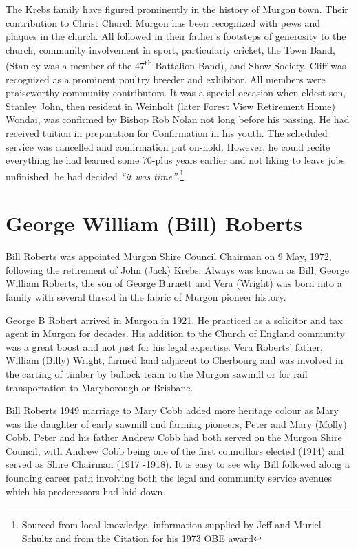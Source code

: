 The Krebs family have figured prominently in the history of Murgon town. Their contribution to Christ Church Murgon has been recognized with pews and plaques in the church. All followed in their father's footsteps of generosity to the church, community involvement in sport, particularly cricket, the Town Band, (Stanley was a member of the 47\textsuperscript{th} Battalion Band), and Show Society. Cliff was recognized as a prominent poultry breeder and exhibitor. All members were praiseworthy community contributors. It was a special occasion when eldest son, Stanley John, then resident in Weinholt (later Forest View Retirement Home) Wondai, was confirmed by Bishop Rob Nolan not long before his passing. He had received tuition in preparation for Confirmation in his youth. The scheduled service was cancelled and confirmation put on-hold. However, he could recite everything he had learned some 70-plus years earlier and not liking to leave jobs unfinished, he had decided \emph{``it was time''}.\footnote{Sourced from local knowledge, information supplied by Jeff and Muriel Schultz and from the Citation for his 1973 OBE award}


\section{George William (Bill) Roberts}



Bill Roberts was appointed Murgon Shire Council Chairman on 9 May, 1972, following the retirement of John (Jack) Krebs. Always was known as Bill, George William Roberts, the son of George Burnett and Vera (Wright) was born into a family with several thread in the fabric of Murgon pioneer history.



George B Robert arrived in Murgon in 1921. He practiced as a solicitor and tax agent in Murgon for decades. His addition to the Church of England community was a great boost and not just for his legal expertise. Vera Roberts' father, William (Billy) Wright, farmed land adjacent to Cherbourg and was involved in the carting of timber by bullock team to the Murgon sawmill or for rail transportation to Maryborough or Brisbane.



Bill Roberts 1949 marriage to Mary Cobb added more heritage colour as Mary was the daughter of early sawmill and farming pioneers, Peter and Mary (Molly) Cobb. Peter and his father Andrew Cobb had both served on the Murgon Shire Council, with Andrew Cobb being one of the first councillors elected (1914) and served as Shire Chairman (1917 -1918). It is easy to see why Bill followed along a founding career path involving both the legal and community service avenues which his predecessors had laid down.



